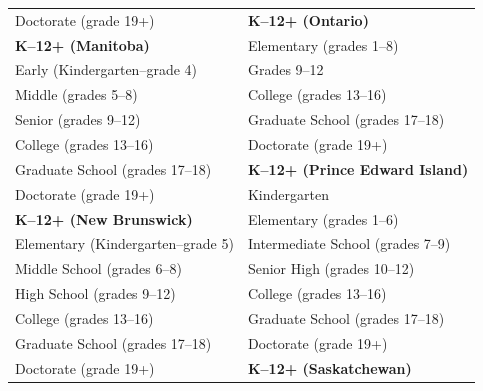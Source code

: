 \documentclass[
]{book}
\theoremstyle{definition}
\theoremstyle{definition}
\theoremstyle{definition}
\theoremstyle{definition}
\theoremstyle{remark}
\begin{document}
\begin{table}
\begin{tabular}[t]{>{}l|l}
\hspace{1em}Doctorate (grade 19+) & \textbf{K–12+ (Ontario)}\\
\textbf{K–12+ (Manitoba)} & \hspace{1em}Elementary (grades 1–8)\\
\hspace{1em}Early (Kindergarten–grade 4) & \hspace{1em}Grades 9–12\\
\hspace{1em}Middle (grades 5–8) & \hspace{1em}College (grades 13–16)\\
\hspace{1em}Senior (grades 9–12) & \hspace{1em}Graduate School (grades 17–18)\\
\hspace{1em}College (grades 13–16) & \hspace{1em}Doctorate (grade \vphantom{1} 19+)\\
\hspace{1em}Graduate School (grades 17–18) & \textbf{K–12+ (Prince Edward Island)}\\
\hspace{1em}Doctorate (grade 19+) & \hspace{1em}Kindergarten\\
\textbf{K–12+ (New Brunswick)} & \hspace{1em}Elementary (grades 1–6)\\
\hspace{1em}Elementary (Kindergarten–grade 5) & \hspace{1em}Intermediate School (grades 7–9)\\
\hspace{1em}Middle School (grades 6–8) & \hspace{1em}Senior High (grades 10–12)\\
\hspace{1em}High School (grades 9–12) & \hspace{1em}College (grades 13–16)\\
\hspace{1em}College (grades 13–16) & \hspace{1em}Graduate School (grades 17–18)\\
\hspace{1em}Graduate School (grades 17–18) & \hspace{1em}Doctorate (grade 19+)\\
\hspace{1em}Doctorate (grade 19+) & \textbf{K–12+ (Saskatchewan)}\\

\end{tabular}
\end{table}
\end{document}

